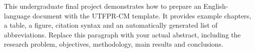 \begin{abstractutfpr}
This undergraduate final project demonstrates how to prepare an English-language document with the UTFPR-CM template. It provides example chapters, a table, a figure, citation syntax and an automatically generated list of abbreviations. Replace this paragraph with your actual abstract, including the research problem, objectives, methodology, main results and conclusions.
\end{abstractutfpr}
